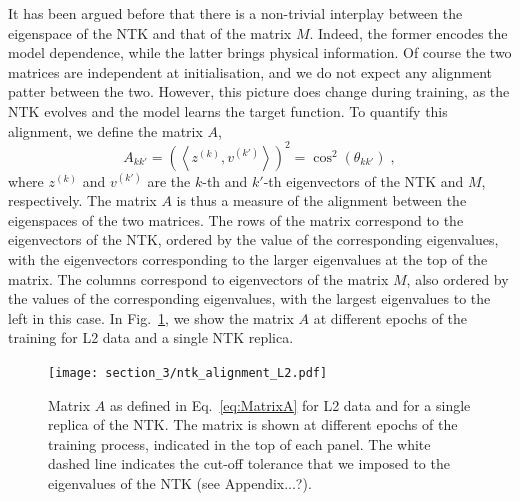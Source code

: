 It has been argued before that there is a non-trivial interplay between the
eigenspace of the NTK and that of the matrix $M$. Indeed, the former encodes the
model dependence, while the latter brings physical information. Of course the
two matrices are independent at initialisation, and we do not expect any
alignment patter between the two. However, this picture does change during
training, as the NTK evolves and the model learns the target function. To
quantify this alignment, we define the matrix $A$, 
\begin{equation}
  \label{eq:MatrixA}
  A_{kk'} = \left( \left< z^{(k)}, v^{(k')}\right> \right)^2 = \cos^2(\theta_{kk'}) \;,
\end{equation}
where $z^{(k)}$ and $v^{(k')}$ are the $k$-th and $k'$-th eigenvectors of the
NTK and $M$, respectively. The matrix $A$ is thus a measure of the alignment
between the eigenspaces of the two matrices. The rows of the matrix correspond
to the eigenvectors of the NTK, ordered by the value of the corresponding
eigenvalues, with the eigenvectors corresponding to the larger eigenvalues at
the top of the matrix. The columns correspond to eigenvectors of the matrix $M$,
also ordered by the values of the corresponding eigenvalues, with the largest
eigenvalues to the left in this case. In Fig.~\ref{fig:NtkMAlign}, we show the
matrix $A$ at different epochs of the training for L2 data and a single NTK
replica. 
\begin{figure}[ht!]
  \centering
  \texttt{[image: section\_3/ntk\_alignment\_L2.pdf]}
  \caption{Matrix $A$ as defined in Eq.~\eqref{eq:MatrixA} for L2 data and for a
  single replica of the NTK. The matrix is shown at different epochs of the
  training process, indicated in the top of each panel. The white dashed line
  indicates the cut-off tolerance that we imposed to the eigenvalues of the NTK
  (see Appendix...?).}
  \label{fig:NtkMAlign}
\end{figure}

